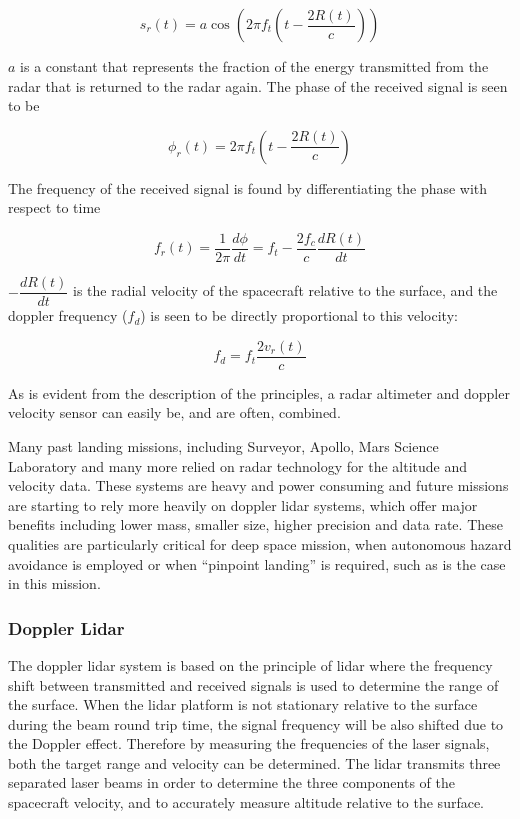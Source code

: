 \begin{equation}
s_r(t)=a \cos(2 \pi f_t(t-\dfrac{2R(t)}{c}))
\end{equation}

$a$ is a constant that represents the fraction of the energy transmitted from the radar
that is returned to the radar again. The phase of the received signal is seen to be 

\begin{equation}
\phi_r(t)=2 \pi f_t(t-\dfrac{2R(t)}{c})
\end{equation}


The frequency of the received signal is found by differentiating the phase with respect
to time

\begin{equation}
f_r(t)=\dfrac{1}{2 \pi}\dfrac{d\phi}{dt} = f_t - \dfrac{2 f_c}{c}\dfrac{dR(t)}{dt}
\end{equation}

$-\dfrac{dR(t)}{dt}$ is the radial velocity of the spacecraft relative to the surface, and the doppler frequency ($f_d$) is seen to be directly proportional to this velocity:

\begin{equation}
f_d= f_t\dfrac{2 v_r(t)}{c}
\end{equation}

As is evident from the description of the principles, a radar altimeter and doppler velocity sensor can easily be, and are often, combined. 

Many past landing missions, including Surveyor, Apollo, Mars Science Laboratory and many more relied on radar
technology for the altitude and velocity data. These systems are heavy and power consuming and future missions are starting to rely more heavily on doppler lidar systems, which offer major benefits including lower mass, smaller
size, higher precision and data rate. These qualities are particularly critical for deep space mission, when autonomous hazard avoidance is employed or when “pinpoint landing” is required, such as is the case in this mission. \cite{alhat}


\subsubsection{Doppler Lidar}

The doppler lidar system is based on the principle of lidar where the frequency shift between transmitted and received signals is used to determine the range of the surface. When the lidar platform is not stationary relative to the surface during the  beam round trip time, the signal frequency will be also shifted due to the Doppler effect. Therefore by measuring the frequencies of the laser signals, both the target range and velocity can be
determined. The lidar transmits three separated laser beams in order to determine the three components of the spacecraft velocity, and to accurately measure altitude relative to the surface. 
 

